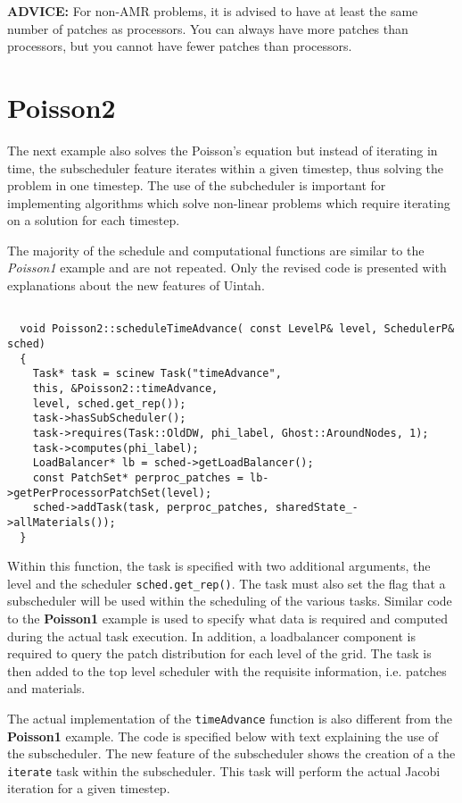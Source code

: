 \documentclass[11pt,fleqn]{book} %
\begin{document}
\textbf{ADVICE:} For non-AMR problems, it is advised to have at least
the same number of patches as processors.  You can always have more
patches than processors, but you cannot have fewer patches than
processors.


\section{Poisson2}

The next example also solves the Poisson's equation but instead of
iterating in time, the subscheduler feature iterates within a given
timestep, thus solving the problem in one timestep.  The use of the
subcheduler is important for implementing algorithms which solve
non-linear problems which require iterating on a solution for each
timestep.

The majority of the schedule and computational functions are similar
to the \emph{Poisson1} example and are not repeated.  Only the revised
code is presented with explanations about the new features of Uintah.

\begin{lstlisting}

  void Poisson2::scheduleTimeAdvance( const LevelP& level, SchedulerP& sched)
  {
    Task* task = scinew Task("timeAdvance",
    this, &Poisson2::timeAdvance,
    level, sched.get_rep());
    task->hasSubScheduler();
    task->requires(Task::OldDW, phi_label, Ghost::AroundNodes, 1);
    task->computes(phi_label);
    LoadBalancer* lb = sched->getLoadBalancer();
    const PatchSet* perproc_patches = lb->getPerProcessorPatchSet(level);
    sched->addTask(task, perproc_patches, sharedState_->allMaterials());
  }

\end{lstlisting}

Within this function, the task is specified with two additional
arguments, the level and the scheduler \texttt{sched.get\_rep()}.  The
task must also set the flag that a subscheduler will be used within
the scheduling of the various tasks.  Similar code to the
\textbf{Poisson1} example is used to specify what data is required and
computed during the actual task execution.  In addition, a
loadbalancer component is required to query the patch distribution for
each level of the grid.  The task is then added to the top level
scheduler with the requisite information, i.e. patches and materials.

The actual implementation of the \texttt{timeAdvance} function is also
different from the \textbf{Poisson1} example.  The code is specified
below with text explaining the use of the subscheduler.  The new
feature of the subscheduler shows the creation of a the
\texttt{iterate} task within the subscheduler.  This task will perform
the actual Jacobi iteration for a given timestep.
\end{document}
